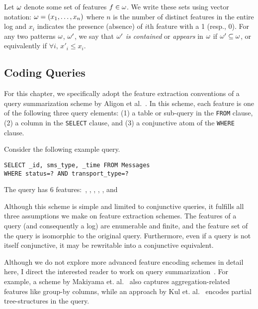 Let $\omega$ denote some set of features $f \in \omega$.
We write these sets using vector notation: $\omega=(x_1,\ldots,x_n)$ where $n$ is the number of distinct features in the entire log and $x_i$ indicates the presence (absence) of $i$th feature with a 1 (resp., 0).  
For any two patterns $\omega$, $\omega'$, we say that $\omega'$ \emph{is contained} or \emph{appears} in $\omega$ if $\omega' \subseteq \omega$, or equivalently if $\forall i,\, x'_i\leq x_i$.  


\subsection{Coding Queries}

For this chapter, we specifically adopt the feature extraction conventions of a query summarization scheme by Aligon et al.~\cite{DBLP:journals/kais/AligonGMRT14}.
In this scheme, each feature is one of the following three query elements:
(1) a table or sub-query in the \texttt{FROM} clause,
(2) a column in the \texttt{SELECT} clause, and 
(3) a conjunctive atom of the \texttt{WHERE} clause.
\begin{example}
\label{exampleQuery}
Consider the following example query.
\begin{lstlisting}
SELECT _id, sms_type, _time FROM Messages
WHERE status=? AND transport_type=?
\end{lstlisting}

\noindent The query has $6$ features$:$ , 
,
,
, 
, 
and 
\end{example}

Although this scheme is simple and limited to conjunctive queries, it fulfills all three assumptions we make on feature extraction schemes.  
The features of a query (and consequently a log) are enumerable and finite, and the feature set of the query is isomorphic to the original query.
Furthermore, even if a query is not itself conjunctive, it may be rewritable into a conjunctive equivalent.

Although we do not explore more advanced feature encoding schemes in detail here, I direct the interested reader to work on query summarization~\cite{DBLP:conf/simbig/MakiyamaRS15,DBLP:conf/adbis/AouicheJD06,DBLP:conf/www/KulLXCCKU16}.
For example, a scheme by Makiyama et. al.~\cite{DBLP:conf/simbig/MakiyamaRS15} also captures aggregation-related features like group-by columns, while an approach by Kul et. al.~\cite{DBLP:conf/www/KulLXCCKU16} encodes partial tree-structures in the query. 

